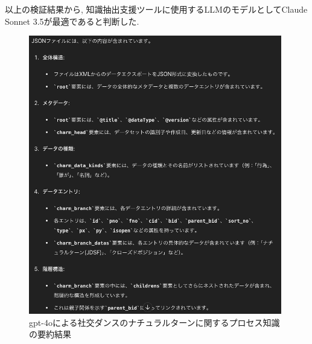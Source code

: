 以上の検証結果から, 知識抽出支援ツールに使用するLLMのモデルとしてClaude Sonnet 3.5が最適であると判断した.

\begin{figure}[htbp]
    \centering
    \includegraphics[width=1.0\linewidth]{./image/natural_turn_summarize_gpt4o.png}
    \caption{gpt-4oによる社交ダンスのナチュラルターンに関するプロセス知識の要約結果}
    \label{fig7}
\end{figure}

